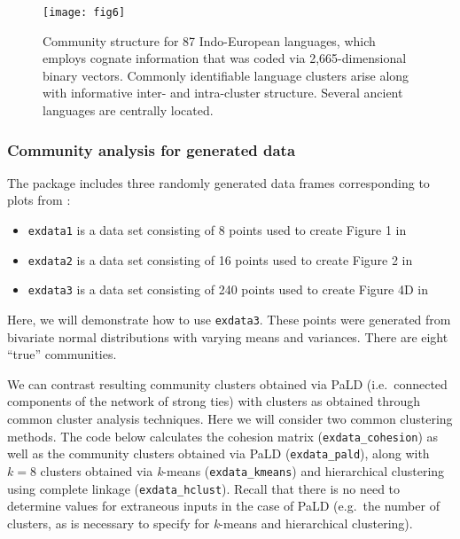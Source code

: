 \begin{figure}[H]
\centering\texttt{[image: fig6]} \caption{Community structure for 87 Indo-European languages, which employs cognate information that was coded via 2,665-dimensional binary vectors. Commonly identifiable language clusters arise along with informative inter- and intra-cluster structure. Several ancient languages are centrally located.}\label{fig:figlang}
\end{figure}

\hypertarget{community-analysis-for-generated-data}{%
\subsubsection{Community analysis for generated data}\label{community-analysis-for-generated-data}}

The  package includes three randomly generated data frames corresponding to plots from \citet{berenhaut2022social}:

\begin{itemize}
\tightlist
\item
  \texttt{exdata1} is a data set consisting of 8 points used to create Figure 1 in \citet{berenhaut2022social}
\item
  \texttt{exdata2} is a data set consisting of 16 points used to create Figure 2 in \citet{berenhaut2022social}
\item
  \texttt{exdata3} is a data set consisting of 240 points used to create Figure 4D in \citet{berenhaut2022social}
\end{itemize}

Here, we will demonstrate how to use \texttt{exdata3}. These points were generated from bivariate normal distributions with varying means and variances. There are eight ``true'' communities.

We can contrast resulting community clusters obtained via PaLD (i.e.~connected components of the network of strong ties) with clusters as obtained through common cluster analysis techniques. Here we will consider two common clustering methods. The code below calculates the cohesion matrix (\texttt{exdata\_cohesion}) as well as the community clusters obtained via PaLD (\texttt{exdata\_pald}), along with \(k=8\) clusters obtained via \emph{k}-means (\texttt{exdata\_kmeans}) and hierarchical clustering using complete linkage (\texttt{exdata\_hclust}). Recall that there is no need to determine values for extraneous inputs in the case of PaLD (e.g.~the number of clusters, as is necessary to specify for \emph{k}-means and hierarchical clustering).

